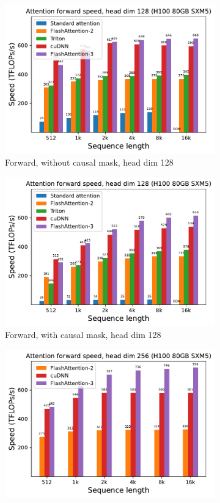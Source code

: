 \begin{figure}[!ht]
\begin{subfigure}{.5\textwidth}
    \includegraphics[width=.95\linewidth]{figs/flash3_h100_causal_False_hdim_128_fwd_speed.pdf}
    \caption{Forward, without causal mask, head dim 128}
  \end{subfigure}%
  \begin{subfigure}{.5\textwidth}
    \centering
    \includegraphics[width=.95\linewidth]{figs/flash3_h100_causal_True_hdim_128_fwd_speed.pdf}
    \caption{Forward, with causal mask, head dim 128}
  \end{subfigure}
  \begin{subfigure}{.5\textwidth}
    \centering
    \includegraphics[width=.95\linewidth]{figs/flash3_h100_causal_False_hdim_256_fwd_speed.pdf}

\end{subfigure}
\end{figure}
